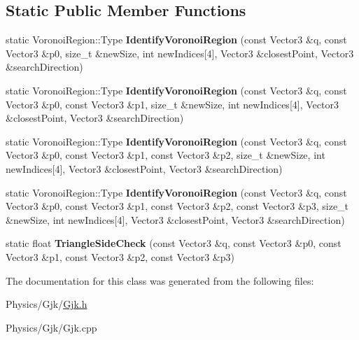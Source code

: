 \subsection*{Static Public Member Functions}
\begin{DoxyCompactItemize}
\item 
\mbox{\label{classGjk_a9de69ef0925e1afc43236df1d9be865b}} 
static Voronoi\+Region\+::\+Type {\bfseries Identify\+Voronoi\+Region} (const Vector3 \&q, const Vector3 \&p0, size\+\_\+t \&new\+Size, int new\+Indices\mbox{[}4\mbox{]}, Vector3 \&closest\+Point, Vector3 \&search\+Direction)
\item 
\mbox{\label{classGjk_a5bb6c28096a505d3fce43747309c87da}} 
static Voronoi\+Region\+::\+Type {\bfseries Identify\+Voronoi\+Region} (const Vector3 \&q, const Vector3 \&p0, const Vector3 \&p1, size\+\_\+t \&new\+Size, int new\+Indices\mbox{[}4\mbox{]}, Vector3 \&closest\+Point, Vector3 \&search\+Direction)
\item 
\mbox{\label{classGjk_aaf0caa32680b0c5bf0b00fa03ec360af}} 
static Voronoi\+Region\+::\+Type {\bfseries Identify\+Voronoi\+Region} (const Vector3 \&q, const Vector3 \&p0, const Vector3 \&p1, const Vector3 \&p2, size\+\_\+t \&new\+Size, int new\+Indices\mbox{[}4\mbox{]}, Vector3 \&closest\+Point, Vector3 \&search\+Direction)
\item 
\mbox{\label{classGjk_afe728560c0bba41c025d04e34a3147b2}} 
static Voronoi\+Region\+::\+Type {\bfseries Identify\+Voronoi\+Region} (const Vector3 \&q, const Vector3 \&p0, const Vector3 \&p1, const Vector3 \&p2, const Vector3 \&p3, size\+\_\+t \&new\+Size, int new\+Indices\mbox{[}4\mbox{]}, Vector3 \&closest\+Point, Vector3 \&search\+Direction)
\item 
\mbox{\label{classGjk_a6a1b3d304d20bc6c762e84dd926f0219}} 
static float {\bfseries Triangle\+Side\+Check} (const Vector3 \&q, const Vector3 \&p0, const Vector3 \&p1, const Vector3 \&p2, const Vector3 \&p3)
\end{DoxyCompactItemize}


The documentation for this class was generated from the following files\+:\begin{DoxyCompactItemize}
\item 
Physics/\+Gjk/\hyperlink{Gjk_8h}{Gjk.\+h}\item 
Physics/\+Gjk/Gjk.\+cpp\end{DoxyCompactItemize}
